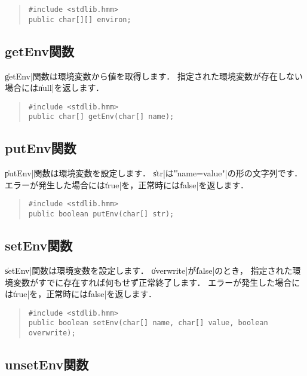 \begin{quote}
\begin{verbatim}
#include <stdlib.hmm>
public char[][] environ;
\end{verbatim}
\end{quote}

\subsection{getEnv関数}

\|getEnv|関数は環境変数から値を取得します．
指定された環境変数が存在しない場合には\|null|を返します．

\begin{quote}
\begin{verbatim}
#include <stdlib.hmm>
public char[] getEnv(char[] name);
\end{verbatim}
\end{quote}

\subsection{putEnv関数}

\|putEnv|関数は環境変数を設定します．
\|str|は\|"name=value"|の形の文字列です．
エラーが発生した場合には\|true|を，正常時には\|false|を返します．

\begin{quote}
\begin{verbatim}
#include <stdlib.hmm>
public boolean putEnv(char[] str);
\end{verbatim}
\end{quote}

\subsection{setEnv関数}

\|setEnv|関数は環境変数を設定します．
\|overwrite|が\|false|のとき，
指定された環境変数がすでに存在すれば何もせず正常終了します．
エラーが発生した場合には\|true|を，正常時には\|false|を返します．

\begin{quote}
\begin{verbatim}
#include <stdlib.hmm>
public boolean setEnv(char[] name, char[] value, boolean overwrite);
\end{verbatim}
\end{quote}

\subsection{unsetEnv関数}

